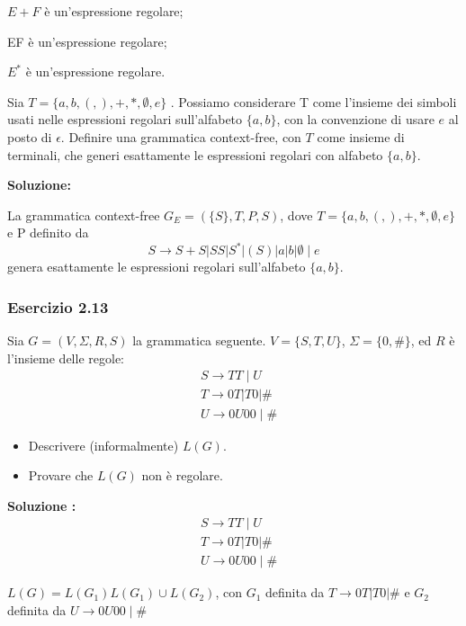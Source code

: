 $E+F$ è un'espressione regolare;

EF è un'espressione regolare;

$E^{*}$ è un'espressione regolare.

\vspace{5mm}

Sia $T=\{a, b,(,),+, *, \emptyset, e\}$ . Possiamo considerare T come l'insieme dei simboli usati nelle espressioni regolari sull'alfabeto $\{a, b\}$, con la convenzione di usare $e$ al posto di $\epsilon$. Definire una grammatica context-free, con $T$ come insieme di terminali, che generi esattamente le espressioni regolari con alfabeto $\{a, b\}$.

\vspace{5mm}

\textbf{Soluzione:}

La grammatica context-free $G_{E}=(\{S\}, T, P, S)$, dove $T=\{a, b,(,),+, *, \emptyset, e\}$ e P definito da
$$
S \rightarrow S+S|S S| S^{*}|(S)| a|b| \emptyset \mid e
$$
genera esattamente le espressioni regolari sull'alfabeto $\{a, b\}$.

\subsubsection{Esercizio 2.13}

Sia $G=(V, \Sigma, R, S)$ la grammatica seguente. $V=\{S, T, U\}$, $\Sigma=\{0, \#\}$, ed $R$ è l'insieme delle regole:
$$
\begin{aligned}
&S \rightarrow T T \mid U \\
&T \rightarrow 0 T|T 0| \# \\
&U \rightarrow 0 U 00 \mid \#
\end{aligned}
$$
\begin{itemize}
    \item Descrivere (informalmente) $L(G)$.
    \item Provare che $L(G)$ non è regolare.
\end{itemize}


\textbf{Soluzione :}
$$
\begin{aligned}
&S \rightarrow T T \mid U \\
&T \rightarrow 0 T|T 0| \# \\
&U \rightarrow 0 U 00 \mid \#
\end{aligned}
$$

$L(G)=L\left(G_{1}\right) L\left(G_{1}\right) \cup L\left(G_{2}\right)$, con $G_{1}$ definita da $T \rightarrow 0 T|T 0| \#$ e $G_{2}$ definita da $U \rightarrow 0 U 00 \mid \#$

